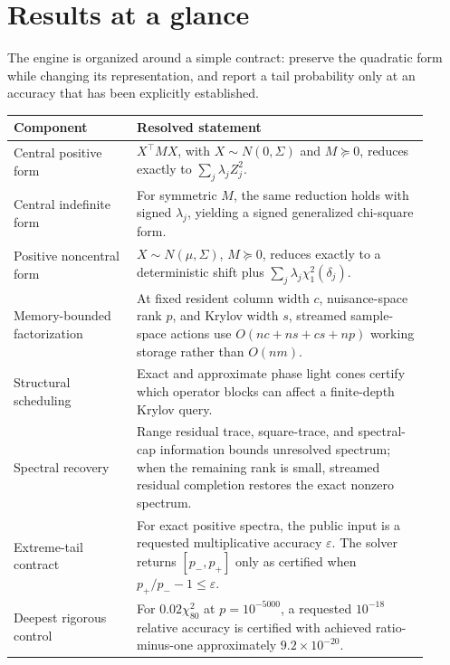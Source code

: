 \documentclass[11pt]{article}
\theoremstyle{definition}
\theoremstyle{remark}
\begin{document}
\section{Results at a glance}

The engine is organized around a simple contract: preserve the quadratic form
while changing its representation, and report a tail probability only at an
accuracy that has been explicitly established.

\begin{center}
\small
\begin{tabular}{@{}p{0.27\linewidth}p{0.64\linewidth}@{}}
\toprule
Component & Resolved statement\\
\midrule
Central positive form &
\(X^\top M X\), with \(X\sim N(0,\Sigma)\) and \(M\succeq0\), reduces
exactly to \(\sum_j\lambda_j Z_j^2\).\\[2mm]

Central indefinite form &
For symmetric \(M\), the same reduction holds with signed
\(\lambda_j\), yielding a signed generalized chi-square form.\\[2mm]

Positive noncentral form &
\(X\sim N(\mu,\Sigma)\), \(M\succeq0\), reduces exactly to a deterministic
shift plus \(\sum_j\lambda_j\chi^2_1(\delta_j)\).\\[2mm]

Memory-bounded factorization &
At fixed resident column width \(c\), nuisance-space rank \(p\), and Krylov
width \(s\), streamed sample-space actions use
\(O(nc+ns+cs+np)\) working storage rather than \(O(nm)\).\\[2mm]

Structural scheduling &
Exact and approximate phase light cones certify which operator blocks can
affect a finite-depth Krylov query.\\[2mm]

Spectral recovery &
Range residual trace, square-trace, and spectral-cap information bounds
unresolved spectrum; when the remaining rank is small, streamed residual
completion restores the exact nonzero spectrum.\\[2mm]

Extreme-tail contract &
For exact positive spectra, the public input is a requested multiplicative
accuracy \(\varepsilon\).  The solver returns
\([p_-,p_+]\) only as certified when
\(p_+/p_- - 1\le\varepsilon\).\\[2mm]

Deepest rigorous control &
For \(0.02\chi^2_{80}\) at \(p=10^{-5000}\), a requested
\(10^{-18}\) relative accuracy is certified with achieved
ratio-minus-one approximately \(9.2\times10^{-20}\).\\
\bottomrule
\end{tabular}
\end{center}
\end{document}
